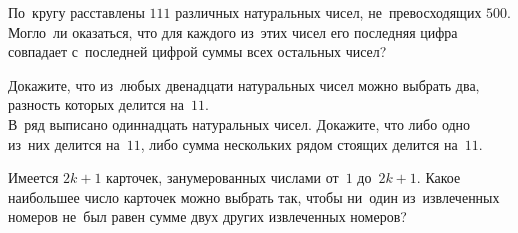 \begin{problems}

\item
По~кругу расставлены $111$ различных натуральных чисел, не~превосходящих $500$.
Могло~ли оказаться, что для каждого из~этих чисел его последняя цифра совпадает
с~последней цифрой суммы всех остальных чисел?

\item
\subproblem
Докажите, что из~любых двенадцати натуральных чисел можно выбрать два,
разность которых делится на~$11$.
\\
\subproblem
В~ряд выписано одиннадцать натуральных чисел.
Докажите, что либо одно из~них делится на~$11$, либо сумма нескольких рядом
стоящих делится на~$11$.

\item
Имеется $2 k + 1$ карточек, занумерованных числами от~$1$ до~$2 k + 1$.
Какое наибольшее число карточек можно выбрать так, чтобы ни~один из~извлеченных
номеров не~был равен сумме двух других извлеченных номеров?

\end{problems}

